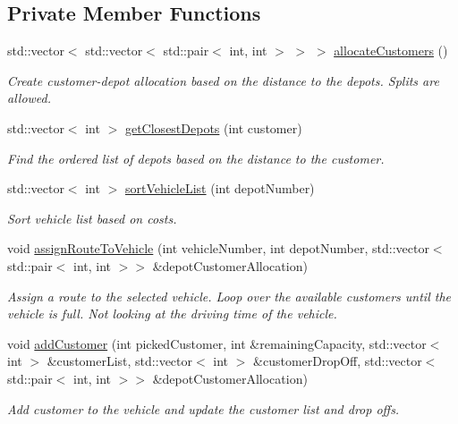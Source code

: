 \subsection*{Private Member Functions}
\begin{DoxyCompactItemize}
\item 
std\+::vector$<$ std\+::vector$<$ std\+::pair$<$ int, int $>$ $>$ $>$ \hyperlink{class_solver_a1f49b9d9d07845d5c5a95df4d2856668}{allocate\+Customers} ()
\begin{DoxyCompactList}\small\item\em Create customer-\/depot allocation based on the distance to the depots. Splits are allowed. \end{DoxyCompactList}\item 
std\+::vector$<$ int $>$ \hyperlink{class_solver_aca1e06acbaf749168eb58749aaaa1128}{get\+Closest\+Depots} (int customer)
\begin{DoxyCompactList}\small\item\em Find the ordered list of depots based on the distance to the customer. \end{DoxyCompactList}\item 
std\+::vector$<$ int $>$ \hyperlink{class_solver_abe099021d3e1329c3f185ed60271164e}{sort\+Vehicle\+List} (int depot\+Number)
\begin{DoxyCompactList}\small\item\em Sort vehicle list based on costs. \end{DoxyCompactList}\item 
void \hyperlink{class_solver_a26c3510331183d3be6470dcb773a9db7}{assign\+Route\+To\+Vehicle} (int vehicle\+Number, int depot\+Number, std\+::vector$<$ std\+::pair$<$ int, int $>$$>$ \&depot\+Customer\+Allocation)
\begin{DoxyCompactList}\small\item\em Assign a route to the selected vehicle. Loop over the available customers until the vehicle is full. Not looking at the driving time of the vehicle. \end{DoxyCompactList}\item 
void \hyperlink{class_solver_a943fbc40cc9d9ede517db697f5f971e9}{add\+Customer} (int picked\+Customer, int \&remaining\+Capacity, std\+::vector$<$ int $>$ \&customer\+List, std\+::vector$<$ int $>$ \&customer\+Drop\+Off, std\+::vector$<$ std\+::pair$<$ int, int $>$$>$ \&depot\+Customer\+Allocation)
\begin{DoxyCompactList}\small\item\em Add customer to the vehicle and update the customer list and drop offs. \end{DoxyCompactList}\item 

\end{DoxyCompactItemize}
